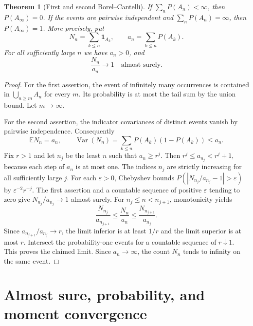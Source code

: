 \documentclass[11pt,oneside,openany]{book}
\theoremstyle{plain}
\newtheorem{theorem}{Theorem}[chapter]
\theoremstyle{definition}
\theoremstyle{remark}
\begin{document}
\begin{theorem}[First and second Borel--Cantelli]
\label{thm:prob-borel-cantelli}
If \(\sum_nP(A_n)<\infty\), then \(P(A_\infty)=0\).
If the events are pairwise independent and \(\sum_nP(A_n)=\infty\),
then \(P(A_\infty)=1\). More precisely, put
\[
 N_n=\sum_{k\le n}\mathbf 1_{A_k},\qquad a_n=\sum_{k\le n}P(A_k).
\]
For all sufficiently large \(n\) we have \(a_n>0\), and
\[
 \frac{N_n}{a_n}\longrightarrow1\quad\text{almost surely}.
\]
\end{theorem}
\begin{proof}
For the first assertion, the event of infinitely many occurrences is
contained in \(\bigcup_{n\ge m}A_n\) for every \(m\). Its probability
is at most the tail sum by the union bound. Let \(m\to\infty\).

For the second assertion, the indicator covariances of distinct
events vanish by pairwise independence. Consequently
\[
 \mathbb E N_n=a_n,\qquad
 \operatorname{Var}(N_n)=\sum_{k\le n}P(A_k)(1-P(A_k))\le a_n .
\]
Fix \(r>1\) and let \(n_j\) be the least \(n\) such that \(a_n\ge r^j\).
Then \(r^j\le a_{n_j}<r^j+1\), because each step of \(a_n\) is at most
one. The indices \(n_j\) are strictly increasing for all sufficiently
large \(j\). For each \(\varepsilon>0\), Chebyshev bounds
\(P(|N_{n_j}/a_{n_j}-1|>\varepsilon)\) by
\(\varepsilon^{-2}r^{-j}\). The first assertion and a countable
sequence of positive \(\varepsilon\) tending to zero give
\(N_{n_j}/a_{n_j}\to1\) almost surely. For \(n_j\le n<n_{j+1}\),
monotonicity yields
\[
 \frac{N_{n_j}}{a_{n_{j+1}}}
 \le \frac{N_n}{a_n}
 \le \frac{N_{n_{j+1}}}{a_{n_j}} .
\]
Since \(a_{n_{j+1}}/a_{n_j}\to r\), the limit inferior is at least
\(1/r\) and the limit superior is at most \(r\).
Intersect the probability-one events for a countable sequence of
\(r\downarrow1\). This proves the claimed limit. Since \(a_n\to\infty\),
the count \(N_n\) tends to infinity on the same event.
\end{proof}

\section{Almost sure, probability, and moment convergence}
\label{p02-04}
\end{document}
